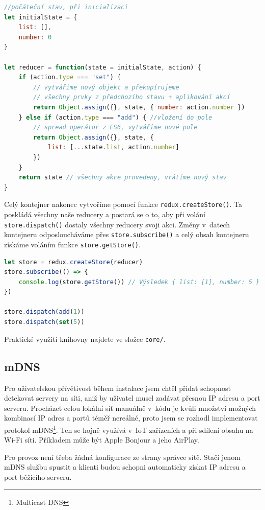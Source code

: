 \documentclass[a4paper,11pt,oneside]{article}
\begin{document}
\pagebreak

\begin{lstlisting}[language=javascript, caption={JavaScript}]
//počáteční stav, při inicializaci
let initialState = {
	list: [],
	number: 0
} 

let reducer = function(state = initialState, action) {
	if (action.type === "set") {
		// vytváříme nový objekt a překopírujeme 
		// všechny prvky z předchozího stavu + aplikování akcí
		return Object.assign({}, state, { number: action.number })
	} else if (action.type === "add") { //vložení do pole 
		// spread operátor z ES6, vytváříme nové pole
		return Object.assign({}, state, { 
			list: [...state.list, action.number] 
		})
	} 
	return state // všechny akce provedeny, vrátíme nový stav
}
\end{lstlisting}

Celý kontejner nakonec vytvoříme pomocí funkce \lstinline|redux.createStore()|. Ta poskládá všechny naše reducery a postará se o to, aby při volání \lstinline|store.dispatch()| dostaly všechny reducery svoji akci. Změny v~datech kontejneru odposloucháváme přes \lstinline|store.subscribe()| a celý obsah kontejneru získáme voláním funkce \lstinline|store.getStore()|.

\begin{lstlisting}[language=javascript, caption={JavaScript}]
let store = redux.createStore(reducer)
store.subscribe(() => {
	console.log(store.getStore()) // Výsledek { list: [1], number: 5 }
})

store.dispatch(add(1))
store.dispatch(set(5))
\end{lstlisting}

Praktické využití knihovny najdete ve složce \lstinline|core/|.

\subsection{mDNS}

Pro uživatelskou přívětivost během instalace jsem chtěl přidat schopnost detekovat servery na síti, aniž by uživatel musel zadávat přesnou IP adresu a port serveru. Procházet celou lokální síť manuálně v~kódu je kvůli množství možných kombinací IP adres a portů téměř nereálné, proto jsem se rozhodl implementovat protokol mDNS\footnote{Multicast DNS}. Ten se hojně využívá v~IoT zařízeních a při sdílení obsahu na Wi-Fi síti. Příkladem může být Apple Bonjour a jeho AirPlay.

Pro provoz není třeba žádná konfigurace ze strany správce sítě. Stačí jenom mDNS službu spustit a klienti budou schopni automaticky získat IP adresu a port běžícího serveru. 
\end{document}
